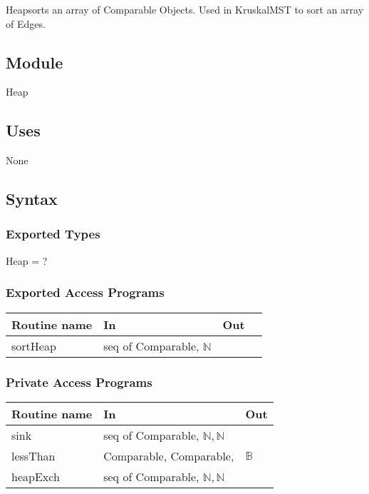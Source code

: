 \documentclass[12pt]{article}
\begin{document}
Heapsorts an array of Comparable Objects. Used in KruskalMST to sort an array of Edges.

\subsection*{Module}

Heap

\subsection* {Uses}

None

\subsection* {Syntax}

\subsubsection* {Exported Types}

Heap = ?

\subsubsection* {Exported Access Programs}

\begin{tabular}{| l | l | l | l |}
\hline
\textbf{Routine name} & \textbf{In} & \textbf{Out}\\
\hline
sortHeap & seq of Comparable, $\mathbb{N}$ & ~ \\
\hline
\end{tabular}

\subsubsection* {Private Access Programs}

\begin{tabular}{| l | l | l |}
\hline
\textbf{Routine name} & \textbf{In} & \textbf{Out}\\
\hline
sink & seq of Comparable, $\mathbb{N}, \mathbb{N}$ & ~ \\
\hline
lessThan & Comparable, Comparable, & $\mathbb{B}$ \\
\hline
heapExch & seq of Comparable, $\mathbb{N}, \mathbb{N}$ & ~ \\
\hline
\end{tabular}
\end{document}
